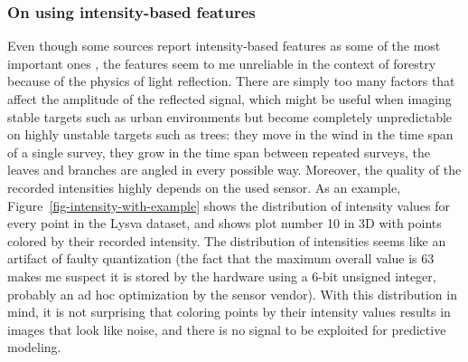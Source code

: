 \subsubsection{On using intensity-based features}\label{sec-intensity-based-features}

Even though some sources report intensity-based features as some of the most important ones \cite{shiImportantLiDARMetrics2018}, the features seem to me unreliable in the context of forestry because of the physics of light reflection.
There are simply too many factors that affect the amplitude of the reflected signal, which might be useful when imaging stable targets such as urban environments but become completely unpredictable on highly unstable targets such as trees: they move in the wind in the time span of a single survey, they grow in the time span between repeated surveys, the leaves and branches are angled in every possible way.
Moreover, the quality of the recorded intensities highly depends on the used sensor.
As an example, Figure~\ref{fig-intensity-with-example} shows the distribution of intensity values for every point in the Lysva dataset, and shows plot number 10 in 3D with points colored by their recorded intensity.
The distribution of intensities seems like an artifact of faulty quantization (the fact that the maximum overall value is 63 makes me suspect it is stored by the hardware using a 6-bit unsigned integer, probably an ad hoc optimization by the sensor vendor).
With this distribution in mind, it is not surprising that coloring points by their intensity values results in images that look like noise, and there is no signal to be exploited for predictive modeling.

